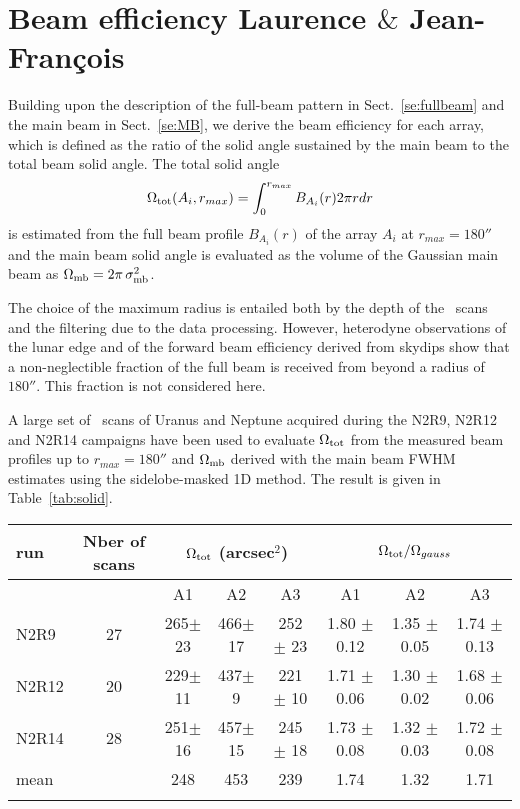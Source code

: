 
\section{Beam efficiency {\color{YellowGreen} Laurence $\&$ Jean-Fran\c cois}}

Building upon the description of the full-beam pattern in
Sect.~\ref{se:fullbeam} and the main beam in Sect.~\ref{se:MB},
we derive the beam efficiency for each array, which is defined as the
ratio of the solid angle sustained by the main beam to the total beam
solid angle.
The total solid angle
\begin{equation}
  \Omega_{\rm{tot}} (A_i, r_{max}) = \int_0^{r_{max}} B_{A_i}(r) 2 \pi r dr
\end{equation}
is estimated from the full beam profile $B_{A_i}(r)$ of the array
$A_i$ at $r_{max} = 180''$ and the main beam solid angle is
evaluated as the volume of the Gaussian main beam as
$\Omega_{\rm{mb}} = 2 \pi\,  \sigma_{\rm{mb}}^2$.

The choice of the maximum radius is entailed both by the depth of
the \bm\ scans and the filtering due to the data processing.   
However, heterodyne observations of the lunar edge and of the forward
beam efficiency derived from skydips show that a non-neglectible
fraction of the full beam is received from beyond a radius of
$180''$. This fraction is not considered here.

A large set of \bm\ scans of Uranus and Neptune acquired during the
N2R9, N2R12 and N2R14 campaigns have been used to evaluate
$\Omega_{\rm{tot}}$ from the measured beam profiles up to
$r_{max} =180''$ and $\Omega_{\rm{mb}}$  derived with the main beam FWHM
estimates using the sidelobe-masked 1D method. The result is given in
Table~\ref{tab:solid}.

\begin{table*}[!h]
\caption{Solid angle of true beam based on Uranus and Neptune observations}
\label{tab:solid}
\centering
\begin{tabular}{l| c | c c c | c c c}
\hline\hline
\noalign{\smallskip}
run  & Nber of scans & \multicolumn{3}{c}{$\Omega_{\rm{tot}}$ (arcsec$^{2}$)} & \multicolumn{3}{c}{$\Omega_{\rm{tot}}/\Omega_{gauss}$} \\
\hline
     &               &  A1    &    A2   &  A3  & A1  &  A2  & A3   \\
            \hline
N2R9    & 27  &  265$\pm$ 23    &  466$\pm$ 17 & 252 $\pm$ 23 &  1.80 $\pm$ 0.12    &  1.35 $\pm$ 0.05   &   1.74 $\pm$ 0.13   \\
N2R12   & 20  &  229$\pm$ 11    &  437$\pm$  9 & 221 $\pm$ 10 &  1.71 $\pm$ 0.06   &  1.30 $\pm$ 0.02   &   1.68 $\pm$ 0.06   \\
N2R14   & 28  &  251$\pm$ 16    &  457$\pm$ 15 & 245 $\pm$ 18 &  1.73 $\pm$ 0.08   &  1.32 $\pm$ 0.03   &   1.72 $\pm$ 0.08   \\
mean    &     &  248            &  453         &  239         &  1.74              &   1.32             &   1.71              \\
\noalign{\smallskip}
\hline
\end{tabular}
\end{table*}



